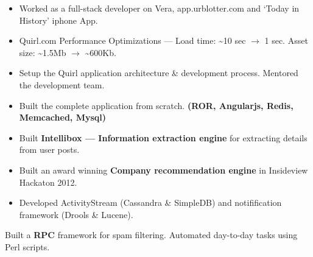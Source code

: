 \documentclass{resume}
\begin{document}
\begin{itemize} \itemsep1pt \parskip0pt
  \item Worked as a full-stack developer on Vera, app.urblotter.com and `Today in History' iphone App.
  \item Quirl.com Performance Optimizations --- Load time: \textasciitilde10 sec \( \rightarrow \) 1 sec.  
    Asset size: \textasciitilde1.5Mb \( \rightarrow \) \textasciitilde600Kb.
  \item Setup the Quirl application architecture \& development process. Mentored the development team.
\end{itemize}
\begin{itemize} \itemsep1pt \parskip0pt
  \item Built the complete application from scratch. \textbf{(ROR, Angularjs, Redis, Memcached, Mysql)}
  \item Built \textbf{Intellibox --- Information extraction engine} for extracting details from user posts.
\end{itemize}
\begin{itemize} \itemsep1pt \parskip0pt
  \item Built an award winning \textbf{Company recommendation engine} in Insideview Hackaton 2012.
  \item Developed ActivityStream (Cassandra \& SimpleDB) and notifification framework (Drools \& Lucene).
\end{itemize}
\raggedright{\-\hspace{0.5cm}Built a \textbf{RPC} framework for spam filtering.  Automated day-to-day tasks using Perl scripts.}
\end{document}
